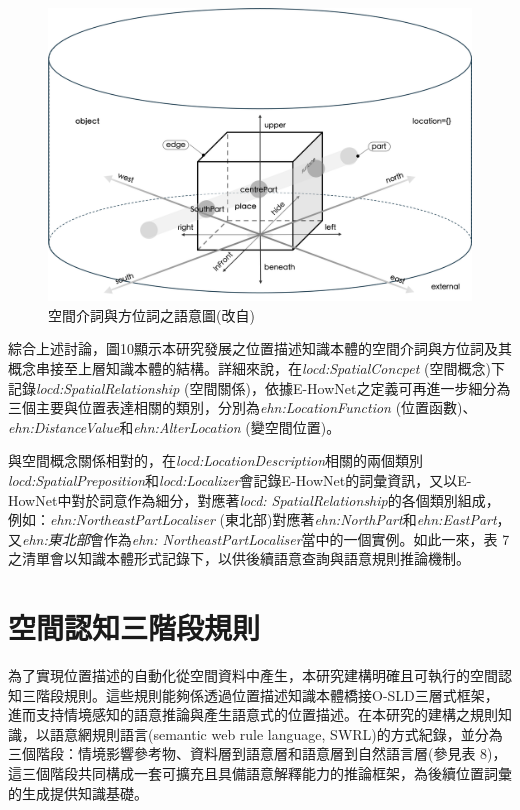 \begin{figure}[!htbp]
\centering
\includegraphics[width = \textwidth]{figures/spatialpreposition.png}
\caption{空間介詞與方位詞之語意圖(改自\citet{RN45})}
\label{fig:spatialpreposition}
\end{figure}


綜合上述討論，圖10顯示本研究發展之位置描述知識本體的空間介詞與方位詞及其概念串接至上層知識本體的結構。詳細來說，在\textit{locd:SpatialConcpet} (空間概念)下記錄\textit{locd:SpatialRelationship} (空間關係)，依據E-HowNet之定義可再進一步細分為三個主要與位置表達相關的類別，分別為\textit{ehn:LocationFunction} (位置函數)、\textit{ehn:DistanceValue}和\textit{ehn:AlterLocation} (變空間位置)。

與空間概念關係相對的，在\textit{locd:LocationDescription}相關的兩個類別\textit{locd:SpatialPreposition}和\textit{locd:Localizer}會記錄E-HowNet的詞彙資訊，又以E-HowNet中對於詞意作為細分，對應著\textit{locd: SpatialRelationship}的各個類別組成，例如：\textit{ehn:NortheastPartLocaliser} (東北部)對應著\textit{ehn:NorthPart}和\textit{ehn:EastPart}，又\textit{ehn:東北部}會作為\textit{ehn: NortheastPartLocaliser}當中的一個實例。如此一來，表 7之清單會以知識本體形式記錄下，以供後續語意查詢與語意規則推論機制。

\section{空間認知三階段規則}

為了實現位置描述的自動化從空間資料中產生，本研究建構明確且可執行的空間認知三階段規則。這些規則能夠係透過位置描述知識本體橋接O-SLD三層式框架，進而支持情境感知的語意推論與產生語意式的位置描述。在本研究的建構之規則知識，以語意網規則語言(semantic web rule language, SWRL)的方式紀錄，並分為三個階段：情境影響參考物、資料層到語意層和語意層到自然語言層(參見表 8)，這三個階段共同構成一套可擴充且具備語意解釋能力的推論框架，為後續位置詞彙的生成提供知識基礎。

